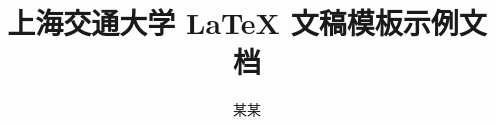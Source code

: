 \documentclass{sjtureport}
\title{上海交通大学 \LaTeX{} 文稿模板示例文档}
\author{某\quad{}某}
\begin{document}
\maketitle

\begin{abstract}
  
\end{abstract}

\tableofcontents



\nocite{*}
\printbibliography[heading=bibintoc]
\end{document}
